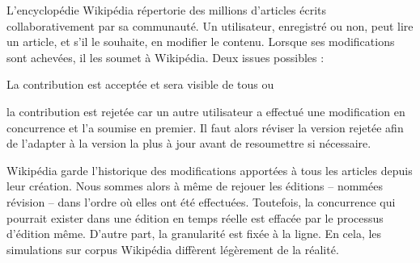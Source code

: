 L'encyclopédie Wikipédia répertorie des millions d'articles écrits
collaborativement par sa communauté. Un utilisateur, enregistré ou non, peut
lire un article, et s'il le souhaite, en modifier le contenu. Lorsque ses
modifications sont achevées, il les soumet à Wikipédia. Deux issues possibles :
\begin{inparaenum}[(i)]
\item La contribution est acceptée et sera visible de tous ou
\item la contribution est rejetée car un autre utilisateur a effectué une
  modification en concurrence et l'a soumise en premier. Il faut alors réviser
  la version rejetée afin de l'adapter à la version la plus à jour avant de
  resoumettre si nécessaire.
\end{inparaenum}
Wikipédia garde l'historique des modifications apportées à tous les articles
depuis leur création. Nous sommes alors à même de rejouer les éditions --
nommées révision -- dans l'ordre où elles ont été effectuées. Toutefois, la
concurrence qui pourrait exister dans une édition en temps réelle est effacée
par le processus d'édition même. D'autre part, la granularité est fixée à la
ligne. En cela, les simulations sur corpus Wikipédia diffèrent légèrement de la
réalité.

